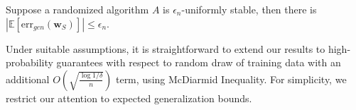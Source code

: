 \documentclass[final,12pt]{colt2018} %
\newcommand{\mb}[1]{\mathbb{#1}}
\newcommand{\mr}[1]{\mathrm{#1}}
\newcommand{\w}{\bm{w}}
\begin{document}
\begin{theorem}\label{stability for generalization}
 \citep{elisseeff2005stability,hardt2015train} Suppose a randomized algorithm $A$ is $\epsilon_n$-uniformly stable, then there is $|\mb{E}[\mr{err}_{gen}(\w_S)]| \leqslant \epsilon_n$.
\end{theorem}
Under suitable assumptions, it is straightforward to extend our results to high-probability guarantees with respect to random draw of training data with an additional $O(\sqrt{\frac{\log 1/\delta}{n}})$ term, using McDiarmid Inequality. For simplicity, we restrict our attention to expected generalization bounds.
\end{document}
